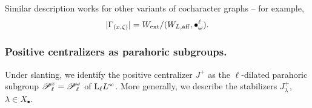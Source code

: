 \begin{remark}
Similar description works for other variants of cocharacter graphs -- for example,  
\begin{equation*}
   |{\Gamma}_{(x, \zeta)}|  = W_{\mathrm{ext}} / (W_{L, \mathrm{aff}}, \bullet^{\ell}_{\omega}). 
\end{equation*}
\end{remark}



\subsubsection{Positive centralizers as parahoric subgroups.}
Under slanting, we identify the positive centralizer $J^+$ as the $\ell$-dilated parahoric subgroup $\operatorname{\mathscr{P}}^{x}_{\ell} = \operatorname{\mathscr{P}}^{\omega}_{\ell}$ of $\mathrm{L}_{\ell} L^{\mathrm{sc}}$.
More generally, we describe the stabilizers $J^{+}_{\lambda}$, $\lambda \in X_{\bullet}$.

